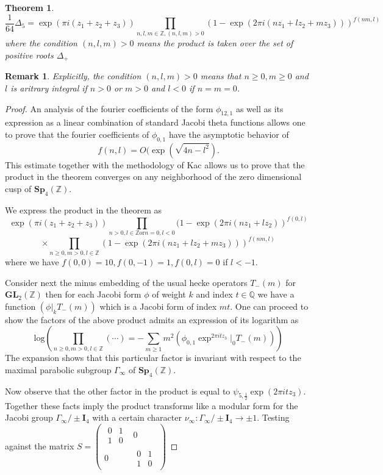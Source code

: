 \documentclass[9pt]{amsart} \usepackage[utf8]{inputenc}
\newtheorem{theorem}{Theorem}
\newtheorem{remark}{Remark}
\newcommand{\Q}{\mathbb{Q}}
\newcommand{\Z}{\mathbb{Z}} \newcommand{\C}{\mathbb{C}}
\newcommand{\Sp}{\mathbf{Sp}}
\newcommand{\GL}{\mathbf{GL}}
\newcommand{\Id}{\mathbf{I}}
\begin{document}
\begin{theorem}
$$\frac{1}{64} \Delta_5 = \exp(\pi i(z_1 + z_2 + z_3)) \displaystyle\prod_{n,l,m \in \Z,
(n,l,m) >0} (1 - \exp(2\pi i(nz_1 + lz_2 + mz_3)))^{f(nm,l)}$$ where the
condition $(n,l,m) > 0$ means the product is taken over the set of
positive roots $\Delta_+$
\end{theorem}

\begin{remark}
Explicitly, the condition $(n,l,m) > 0$ means that $n\geq 0,m\geq 0$ and
$l$ is aritrary integral if $n>0$ or $m > 0$ and $l<0$ if $n = m = 0$.
\end{remark}

\begin{proof}
An analysis of the fourier coefficients of the form $\phi_{12,1}$ as
well as its expression as a linear combination of standard Jacobi theta
functions allows one to prove that the fourier coefficients of
$\phi_{0,1}$ have the asymptotic behavior of $$f(n,l) =O(\exp(\sqrt{4n
-l^2}).$$ This estimate together with the methodology of Kac\cite{KAC:1}
allows us to prove that the product in the theorem converges on any
neighborhood of the zero dimensional cusp of $\Sp_4(\Z)$.

We express the product in the theorem as $$\exp(\pi i(z_1 + z_2 + z_3))
\displaystyle\prod_{n>0,l\in\Z \textrm{or} n=0, l<0}(1 -\exp(2\pi i(nz_1 +
lz_2))^{f(0,l)}$$ $$ \times \displaystyle\prod_{n\geq0,m>0,l\in\Z}(1 - \exp(2\pi i(n z_1 + l
z_2 + m z_3)))^{f(nm,l)}$$ where we have $f(0,0) = 10, f(0,-1) =1,
f(0,l) = 0$ if $l < -1$.


Consider next the minus embedding of the usual hecke operators
$T_{-}(m)$ for $\GL_2(\Z)$ then for each Jacobi form $\phi$ of weight
$k$ and index $t \in \Q$ we have a function $(\phi |_k T_{-}(m))$ which
is a Jacobi form of index $mt$. One can proceed to show the factors of
the above product admits an expression of its logarithm as
$$\textrm{log}(\displaystyle\prod_{n\geq 0,m>0,l\in\Z} (\cdots) = - \sum_{m\geq 1} m^2
(\phi_{0,1}\exp^{2\pi i t z_3}|_0 T_{-}(m)))$$ The expansion shows that
this particular factor is invariant with respect to the maximal
parabolic subgroup $\Gamma_{\infty}$ of $\Sp_4(\Z)$.

  Now observe that the other factor in the product is equal to
  $\psi_{5,\frac{1}{2}}\exp(2\pi i t z_3)$. Together these facts imply
  the product transforms like a modular form for the Jacobi group
  $\Gamma_{\infty} / \pm\Id_4$ with a certain character $\nu_{\infty} :
  \Gamma_{\infty} / \pm\Id_4 \rightarrow \pm 1$. Testing against the
  matrix $S = \begin{pmatrix}\begin{matrix}0 & 1\\ 1 & 0\end{matrix} & 0\\ 0 &
  \begin{matrix}0 & 1\\1 & 0\end{matrix}\end{pmatrix}$


\end{proof}
\end{document}
